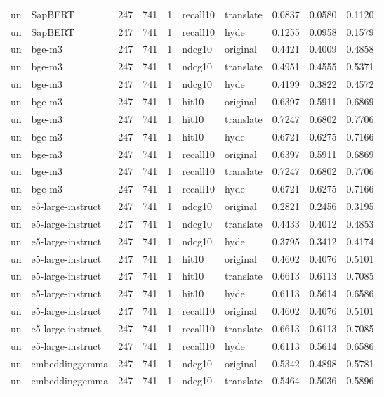 \begin{tabular}{llrrrllrrr}
un & SapBERT & 247 & 741 & 1 & recall10 & translate & 0.0837 & 0.0580 & 0.1120 \\
un & SapBERT & 247 & 741 & 1 & recall10 & hyde & 0.1255 & 0.0958 & 0.1579 \\
un & bge-m3 & 247 & 741 & 1 & ndcg10 & original & 0.4421 & 0.4009 & 0.4858 \\
un & bge-m3 & 247 & 741 & 1 & ndcg10 & translate & 0.4951 & 0.4555 & 0.5371 \\
un & bge-m3 & 247 & 741 & 1 & ndcg10 & hyde & 0.4199 & 0.3822 & 0.4572 \\
un & bge-m3 & 247 & 741 & 1 & hit10 & original & 0.6397 & 0.5911 & 0.6869 \\
un & bge-m3 & 247 & 741 & 1 & hit10 & translate & 0.7247 & 0.6802 & 0.7706 \\
un & bge-m3 & 247 & 741 & 1 & hit10 & hyde & 0.6721 & 0.6275 & 0.7166 \\
un & bge-m3 & 247 & 741 & 1 & recall10 & original & 0.6397 & 0.5911 & 0.6869 \\
un & bge-m3 & 247 & 741 & 1 & recall10 & translate & 0.7247 & 0.6802 & 0.7706 \\
un & bge-m3 & 247 & 741 & 1 & recall10 & hyde & 0.6721 & 0.6275 & 0.7166 \\
un & e5-large-instruct & 247 & 741 & 1 & ndcg10 & original & 0.2821 & 0.2456 & 0.3195 \\
un & e5-large-instruct & 247 & 741 & 1 & ndcg10 & translate & 0.4433 & 0.4012 & 0.4853 \\
un & e5-large-instruct & 247 & 741 & 1 & ndcg10 & hyde & 0.3795 & 0.3412 & 0.4174 \\
un & e5-large-instruct & 247 & 741 & 1 & hit10 & original & 0.4602 & 0.4076 & 0.5101 \\
un & e5-large-instruct & 247 & 741 & 1 & hit10 & translate & 0.6613 & 0.6113 & 0.7085 \\
un & e5-large-instruct & 247 & 741 & 1 & hit10 & hyde & 0.6113 & 0.5614 & 0.6586 \\
un & e5-large-instruct & 247 & 741 & 1 & recall10 & original & 0.4602 & 0.4076 & 0.5101 \\
un & e5-large-instruct & 247 & 741 & 1 & recall10 & translate & 0.6613 & 0.6113 & 0.7085 \\
un & e5-large-instruct & 247 & 741 & 1 & recall10 & hyde & 0.6113 & 0.5614 & 0.6586 \\
un & embeddinggemma & 247 & 741 & 1 & ndcg10 & original & 0.5342 & 0.4898 & 0.5781 \\
un & embeddinggemma & 247 & 741 & 1 & ndcg10 & translate & 0.5464 & 0.5036 & 0.5896 \\

\end{tabular}
